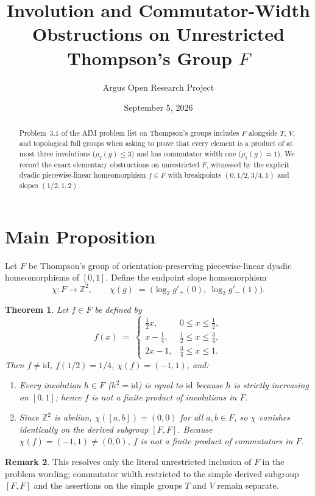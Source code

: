 \documentclass[10pt,reqno]{amsart}
\title[Involution and Commutator-Width Obstructions in Thompson's Group $F$]
{Involution and Commutator-Width Obstructions on Unrestricted Thompson's Group $F$}
\author{Argus Open Research Project}
\date{September 5, 2026}
\newtheorem{theorem}{Theorem}[section]
\theoremstyle{definition}
\newtheorem{remark}[theorem]{Remark}
\begin{document}
\begin{abstract}
Problem~3.1 of the AIM problem list on Thompson's groups includes $F$ alongside $T$, $V$, and topological full groups when asking to prove that every element is a product of at most three involutions ($\rho_2(g)\le 3$) and has commutator width one ($\rho_1(g)=1$). We record the exact elementary obstructions on unrestricted $F$, witnessed by the explicit dyadic piecewise-linear homeomorphism $f\in F$ with breakpoints $(0,1/2,3/4,1)$ and slopes $(1/2,1,2)$.
\end{abstract}
\maketitle
\section{Main Proposition}
Let $F$ be Thompson's group of orientation-preserving piecewise-linear dyadic homeomorphisms of $[0,1]$. Define the endpoint slope homomorphism
\[
  \chi : F \longrightarrow \mathbb{Z}^2, \qquad \chi(g) \;=\; \bigl(\log_2 g'_+(0),\ \log_2 g'_-(1)\bigr).
\]
\begin{theorem}
Let $f\in F$ be defined by
\[
  f(x) \;=\;
  \begin{cases}
    \frac{1}{2}x, & 0\le x\le \frac{1}{2}, \\[2pt]
    x - \frac{1}{4}, & \frac{1}{2}\le x\le \frac{3}{4}, \\[2pt]
    2x - 1, & \frac{3}{4}\le x\le 1.
  \end{cases}
\]
Then $f\neq\mathrm{id}$, $f(1/2)=1/4$, $\chi(f)=(-1,1)$, and:
\begin{enumerate}[label=\textup{(\arabic*)}]
  \item Every involution $h\in F$ ($h^2=\mathrm{id}$) is equal to $\mathrm{id}$ because $h$ is strictly increasing on $[0,1]$; hence $f$ is not a finite product of involutions in $F$.
  \item Since $\mathbb{Z}^2$ is abelian, $\chi([a,b])=(0,0)$ for all $a,b\in F$, so $\chi$ vanishes identically on the derived subgroup $[F,F]$. Because $\chi(f)=(-1,1)\neq(0,0)$, $f$ is not a finite product of commutators in $F$.
\end{enumerate}
\end{theorem}
\begin{remark}
This resolves only the literal unrestricted inclusion of $F$ in the problem wording; commutator width restricted to the simple derived subgroup $[F,F]$ and the assertions on the simple groups $T$ and $V$ remain separate.
\end{remark}
\end{document}
